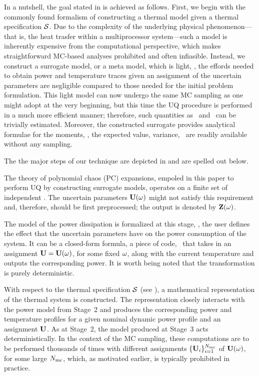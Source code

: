 
In a nutshell, the goal stated in  is achieved as follows. First, we begin with the commonly found formalism of constructing a thermal model given a thermal specification $\mathcal{S}$. Due to the complexity of the underlying physical phenomenon---that is, the heat trasfer within a multiprocessor system---such a model is inherently expensive from the computational perspective, which makes straightforward MC-based analyses prohibited and often infiasible. Instead, we construct a surrogate model, or a meta model, which is light, \ie, the effords needed to obtain power and temperature traces given an assignment of the uncertain parameters are negligible compared to those needed for the initial problem formulation. This light model can now undergo the same MC sampling as one might adopt at the very beginning, but this time the UQ procedure is performed in a much more efficient manner; therefore, such quantities as \cdfs\ and \pdfs\ can be trivially estimated. Moreover, the constructed surrogate provides analytical formulae for the moments, \ie, the expected value, variance, \etc\ are readily available without any sampling.

The the major steps of our technique are depicted in  and are spelled out below.

 The theory of polynomial chaos (PC) expansions, empoled in this paper to perform UQ by constructing surrogate models, operates on a finite set of independent \rvs. The uncertain parameters $\mathbf{U}(\omega)$ might not satisfy this requirement and, therefore, should be first preprocessed; the output is denoted by $\mathbf{Z}(\omega)$.

 The model of the power dissipation is formalized at this stage, \ie, the user defines the effect that the uncertain parameters have on the power consumption of the system. It can be a closed-form formula, a piece of code, \etc\ that takes in an assignment $\mathbf{U} = \mathbf{U}(\omega)$, for some fixed $\omega$, along with the current temperature and outputs the corresponding power. It is worth being noted that the transformation is purely deterministic.

 With respect to the thermal specification $\mathcal{S}$ (see ), a mathematical representation of the thermal system is constructed. The representation closely interacts with the power model from Stage~2 and produces the corresponding power and temperature profiles for a given nominal dynamic power profile and an assignment $\mathbf{U}$. As at Stage~2, the model produced at Stage~3 acts deterministically. In the context of the MC sampling, these computations are to be performed thousands of times with different assignments $\{ \mathbf{U}_i \}_{i = 1}^{N_\text{mc}}$ of $\mathbf{U}(\omega)$, for some large $N_\text{mc}$, which, as motivated earlier, is typically prohibited in practice.

